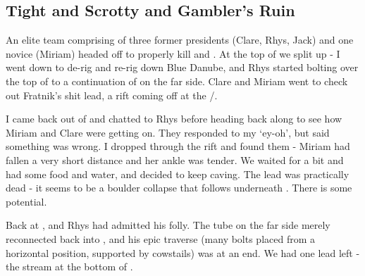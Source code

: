  

\subsection{Tight and Scrotty and Gambler's Ruin}

An elite team comprising of three former presidents (Clare, Rhys, Jack) and one novice (Miriam) headed off to properly kill  and . At the top of  we split up - I went down  to de-rig and re-rig down Blue Danube, and Rhys started bolting over the top of  to a continuation of  on the far side. Clare and Miriam went to check out Fratnik's shit lead, a rift coming off at the /.


I came back out of  and chatted to Rhys before heading back along  to see how Miriam and Clare were getting on. They responded to my `ey-oh', but said something was wrong. I dropped through the rift and found them - Miriam had fallen a very short distance and her ankle was tender. We waited for a bit and had some food and water, and decided to keep caving. The lead was practically dead - it seems to be a boulder collapse that follows underneath . There is some potential.
 
Back at , and Rhys had admitted his folly. The tube on the far side merely reconnected back into , and his epic traverse (many bolts placed from a horizontal position, supported by cowstails) was at an end. We had one lead left - the stream at the bottom of .
 
